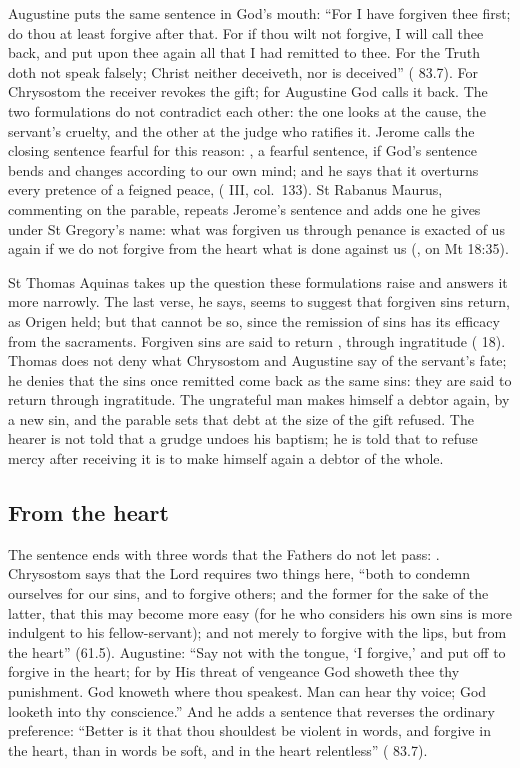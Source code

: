 Augustine puts the same sentence in God's mouth: ``For I have forgiven thee
first; do thou at least forgive after that. For if thou wilt not forgive, I will
call thee back, and put upon thee again all that I had remitted to thee. For the
Truth doth not speak falsely; Christ neither deceiveth, nor is deceived''
( 83.7). For Chrysostom the receiver revokes the gift; for Augustine
God calls it back. The two formulations do not contradict each other: the one
looks at the cause, the servant's cruelty, and the other at the judge who
ratifies it. Jerome calls the closing sentence fearful for this reason:
, a fearful sentence, if God's sentence bends and changes according
to our own mind; and he says that it overturns every pretence of a feigned peace,
 ( III,
col.~133). St Rabanus Maurus, commenting on the parable, repeats Jerome's sentence
and adds one he gives under St Gregory's name: what was forgiven us through
penance is exacted of us again if we do not forgive from the heart what is done
against us (, on Mt 18:35).

St Thomas Aquinas takes up the question these formulations raise and answers it
more narrowly. The last verse, he says, seems to suggest that forgiven sins
return, as Origen held; but that cannot be so, since the remission of sins has its
efficacy from the sacraments. Forgiven sins are said to return , through ingratitude ( 18). Thomas does not
deny what Chrysostom and Augustine say of the servant's fate; he denies that the
sins once remitted come back as the same sins: they are said to return through
ingratitude. The ungrateful man makes himself a debtor again, by a new sin, and
the parable sets that debt at the size of the gift refused. The hearer is not told that a grudge undoes his baptism; he is
told that to refuse mercy after receiving it is to make himself again a debtor
of the whole.

\subsection{From the heart}

The sentence ends with three words that the Fathers do not let pass: . Chrysostom says that the Lord requires two things here, ``both
to condemn ourselves for our sins, and to forgive others; and the former for the
sake of the latter, that this may become more easy (for he who considers his own
sins is more indulgent to his fellow-servant); and not merely to forgive with the
lips, but from the heart'' (61.5). Augustine: ``Say not with the tongue, `I
forgive,' and put off to forgive in the heart; for by His threat of vengeance God
showeth thee thy punishment. God knoweth where thou speakest. Man can hear thy
voice; God looketh into thy conscience.'' And he adds a sentence that reverses the
ordinary preference: ``Better is it that thou shouldest be violent in words, and
forgive in the heart, than in words be soft, and in the heart relentless''
( 83.7).

